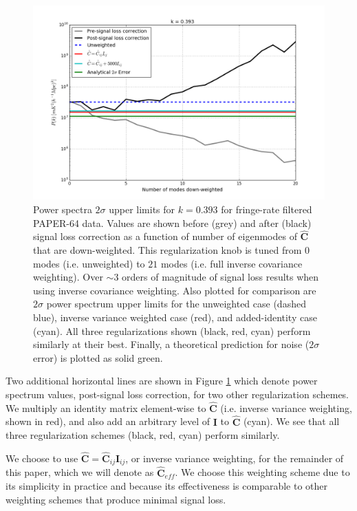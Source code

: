 \documentclass[preprint2,numberedappendix,tighten]{aastex6}  %
\begin{document}
\begin{figure}
	\centering
	\includegraphics[width=1\textwidth]{plots/sigloss_modeloop.png}
	\caption{Power spectra $2\sigma$ upper limits for $k=0.393$ for fringe-rate filtered PAPER-64 data. Values are shown before (grey) and after (black) signal loss correction as a function of number of eigenmodes of $\hat{\textbf{C}}$ that are down-weighted. This regularization knob is tuned from $0$ modes (i.e. unweighted) to $21$ modes (i.e. full inverse covariance weighting). Over $\sim3$ orders of magnitude of signal loss results when using inverse covariance weighting. Also plotted for comparison are $2\sigma$ power spectrum upper limits for the unweighted case (dashed blue), inverse variance weighted case (red), and added-identity case (cyan). All three regularizations shown (black, red, cyan) perform similarly at their best. Finally, a theoretical prediction for noise ($2\sigma$ error) is plotted as solid green.}
	\label{fig:sigloss_modeloop}
\end{figure}

Two additional horizontal lines are shown in Figure \ref{fig:sigloss_modeloop} which denote power spectrum values, post-signal loss correction, for two other regularization schemes. We multiply an identity matrix element-wise to $\hat{\textbf{C}}$ (i.e. inverse variance weighting, shown in red), and also add an arbitrary level of $\textbf{I}$ to $\hat{\textbf{C}}$ (cyan). We see that all three regularization schemes (black, red, cyan) perform similarly. 

We choose to use $\hat{\textbf{C}} = \hat{\textbf{C}}_{ij}\textbf{I}_{ij}$, or inverse variance weighting, for the remainder of this paper, which we will denote as $\hat{\textbf{C}}_{eff}$. We choose this weighting scheme due to its simplicity in practice and because its effectiveness is comparable to other weighting schemes that produce minimal signal loss.
\end{document}
